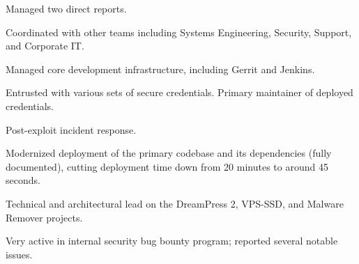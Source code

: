 \item Managed two direct reports.
\item Coordinated with other teams including Systems Engineering, Security, Support, and Corporate IT.
\item Managed core development infrastructure, including Gerrit and Jenkins.
\item Entrusted with various sets of secure credentials. Primary maintainer of deployed credentials.
\item Post-exploit incident response.
\item Modernized deployment of the primary codebase and its dependencies (fully documented), cutting deployment time down from 20 minutes to around 45 seconds.
\item Technical and architectural lead on the DreamPress 2, VPS-SSD, and Malware Remover projects.
\item Very active in internal security bug bounty program; reported several notable issues.
